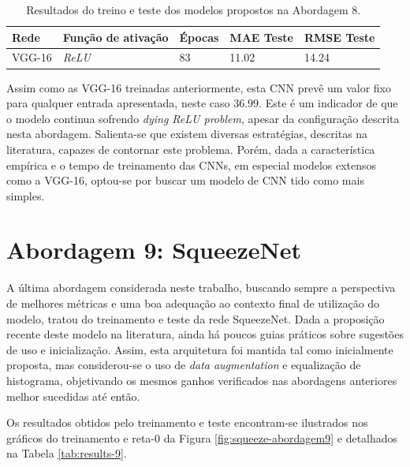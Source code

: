 \begin{table}[!ht]
\centering
\caption{Resultados do treino e teste dos modelos propostos na Abordagem 8.}
\label{tab:results-8}
 \begin{tabular}{l l l l l }
	 \toprule
	 Rede & Função de ativação & Épocas & MAE Teste & RMSE Teste \\
	 \midrule
	 VGG-16 & \emph{ReLU} & 83 & 11.02 & 14.24 \\
	 \bottomrule
 \end{tabular}
\end{table}

Assim como as VGG-16 treinadas anteriormente, esta CNN prevê um valor fixo para qualquer entrada apresentada, neste caso $36.99$. Este é um indicador de que o modelo continua sofrendo \emph{dying ReLU problem}, apesar da configuração descrita nesta abordagem. Salienta-se que existem diversas estratégias, descritas na literatura, capazes de contornar este problema. Porém, dada a característica empírica e o tempo de treinamento das CNNs, em especial modelos extensos como a VGG-16, optou-se por buscar um modelo de CNN tido como mais simples.

\section{Abordagem 9: SqueezeNet}

	A última abordagem considerada neste trabalho, buscando sempre a perspectiva de melhores métricas e uma boa adequação ao contexto final de utilização do modelo, tratou do treinamento e teste da rede SqueezeNet. Dada a proposição recente deste modelo na literatura, ainda há poucos guias práticos sobre sugestões de uso e inicialização. Assim, esta arquitetura foi mantida tal como inicialmente proposta, mas considerou-se o uso de \emph{data augmentation} e equalização de histograma, objetivando os mesmos ganhos verificados nas abordagens anteriores melhor sucedidas até então.

	Os resultados obtidos pelo treinamento e teste encontram-se ilustrados nos gráficos do treinamento e reta-0 da Figura \ref{fig:squeeze-abordagem9} e detalhados na Tabela \ref{tab:results-9}.

